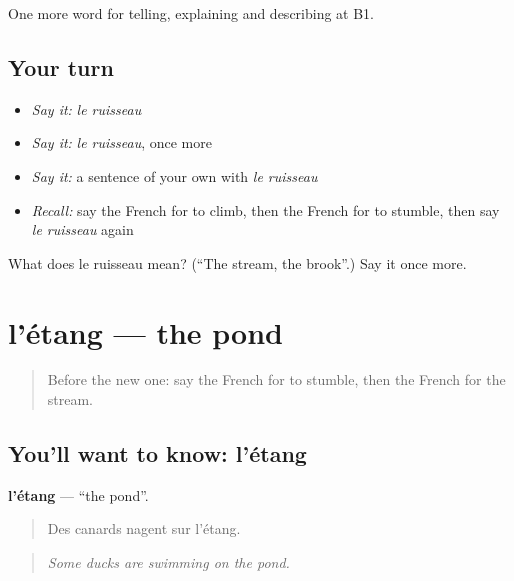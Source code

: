 \begin{grammarlens}[title={What you've built}]
One more word for telling, explaining and describing at B1.
\end{grammarlens}

\subsection*{Your turn}
\begin{itemize}
\raggedright
  \item \emph{Say it:} \emph{le ruisseau}
  \item \emph{Say it:} \emph{le ruisseau}, once more
  \item \emph{Say it:} a sentence of your own with \emph{le ruisseau}
  \item \emph{Recall:} say the French for to climb, then the French for to stumble, then say \emph{le ruisseau} again
\end{itemize}

\begin{tcolorbox}[breakable,colback=teal!4,colframe=teal!35!black,title={Before you move on}]
What does le ruisseau mean? (\textquotedblleft{}The stream, the brook\textquotedblright{}.) Say it once more.
\end{tcolorbox}
\section[l'étang]{l'étang — the pond}

\label{lesson:FR-C456-etang}



\begin{quote}
Before the new one: say the French for to stumble, then the French for the stream.
\end{quote}

\subsection*{You'll want to know: l'étang}
\textbf{l'étang} — \textquotedblleft{}the pond\textquotedblright{}.

\begin{quote}
Des canards nagent sur l'étang.
\end{quote}

\begin{quote}
\emph{Some ducks are swimming on the pond.}
\end{quote}

